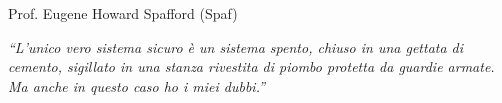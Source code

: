 \documentclass[aspectratio=1610]{beamer}
\begin{document}
\begin{frame}{Prof. Eugene Howard Spafford (Spaf)}
    \begin{minipage}{0.98\linewidth}
        \centering
        \huge
        \textit{``L’unico vero sistema sicuro è un sistema spento, chiuso in una gettata di cemento, 
        sigillato in una stanza rivestita di piombo protetta da guardie armate. 
        Ma anche in questo caso ho i miei dubbi.''}
    \end{minipage}
\end{frame}
\end{document}

